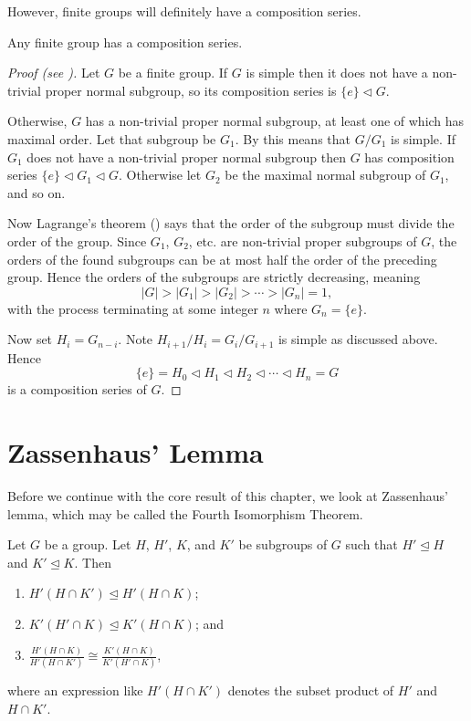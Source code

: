 However, finite groups will definitely have a composition series.

\begin{theorem}\label{thrm-finite-group-has-composition-series}
    Any finite group has a composition series.
\end{theorem}
\begin{proof}[Proof (see {\cite[Theorem I.8.4]{hungerford_1980}})]
    Let $G$ be a finite group. If $G$ is simple then it does not have a non-trivial proper normal subgroup, so its composition series is $\{e\} \lhd G$.

    Otherwise, $G$ has a non-trivial proper normal subgroup, at least one of which has maximal order. Let that subgroup be $G_1$. By  this means that $G/G_1$ is simple. If $G_1$ does not have a non-trivial proper normal subgroup then $G$ has composition series $\{e\} \lhd G_1 \lhd G$. Otherwise let $G_2$ be the maximal normal subgroup of $G_1$, and so on.

    Now Lagrange's theorem () says that the order of the subgroup must divide the order of the group. Since $G_1$, $G_2$, etc. are non-trivial proper subgroups of $G$, the orders of the found subgroups can be at most half the order of the preceding group. Hence the orders of the subgroups are strictly decreasing, meaning
    \[
        |G| > |G_1| > |G_2| > \cdots > |G_n| = 1,
    \]
    with the process terminating at some integer $n$ where $G_n = \{e\}$.

    Now set $H_i = G_{n-i}$. Note $H_{i+1}/H_i = G_i/G_{i+1}$ is simple as discussed above. Hence
    \[
        \{e\} = H_0 \lhd H_1 \lhd H_2 \lhd \cdots \lhd H_n = G
    \]
    is a composition series of $G$.
\end{proof}

\section{Zassenhaus' Lemma}
Before we continue with the core result of this chapter, we look at Zassenhaus' lemma, which may be called the Fourth Isomorphism Theorem.

\begin{lemma}[Zassenhaus]\label{lemma-zassenhaus}
    Let $G$ be a group. Let $H$, $H'$, $K$, and $K'$ be subgroups of $G$ such that $H' \unlhd H$ and $K' \unlhd K$. Then
    \begin{enumerate}
        \item $H'(H \cap K') \unlhd H' (H \cap K)$;
        \item $K'(H' \cap K) \unlhd K' (H \cap K)$; and
        \item $\frac{H'(H\cap K)}{H'(H\cap K')} \cong \frac{K'(H\cap K)}{K'(H'\cap K)}$,
    \end{enumerate}
    where an expression like $H'(H \cap K')$ denotes the subset product of $H'$ and $H \cap K'$.
\end{lemma}

